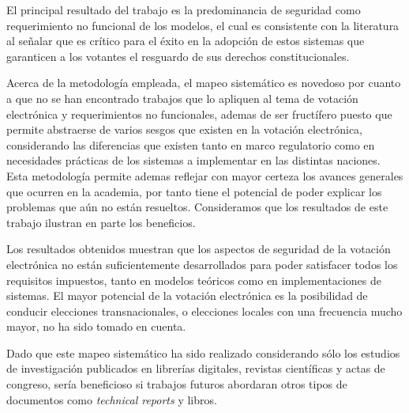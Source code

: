El principal resultado del trabajo es la predominancia de seguridad como requerimiento no 
funcional de los modelos, el cual es consistente con la literatura al señalar que es crítico 
para el éxito en la adopción de estos sistemas que garanticen a los votantes el resguardo 
de sus derechos constitucionales.
	
Acerca de la metodología empleada, el mapeo sistemático es novedoso por cuanto a que 
no se han encontrado trabajos que lo apliquen al tema de votación electrónica y requerimientos no funcionales,
ademas de ser fructífero puesto que 
permite abstraerse de varios sesgos que existen en la votación electrónica, 
considerando las diferencias que existen tanto en marco regulatorio como en necesidades prácticas
de los sistemas a implementar en las distintas naciones. Esta metodología permite ademas
reflejar con mayor certeza los avances generales que ocurren en la academia, por tanto tiene el potencial
de poder explicar los problemas que aún no están resueltos. Consideramos que los resultados
de este trabajo ilustran en parte los beneficios.

Los resultados obtenidos muestran que los aspectos de seguridad de la votación electrónica
no están suficientemente desarrollados para poder satisfacer todos los requisitos impuestos, tanto en 
modelos teóricos como en implementaciones de sistemas. El mayor potencial de la votación electrónica
es la posibilidad de conducir elecciones transnacionales, o elecciones locales con una frecuencia
mucho mayor, no ha sido tomado en cuenta.		

Dado que este mapeo sistemático ha sido realizado considerando sólo
los estudios de investigación publicados en librerías digitales, revistas científicas y actas 
de congreso, sería beneficioso si trabajos futuros abordaran otros tipos de documentos como
\textit{technical reports} y libros.




 


